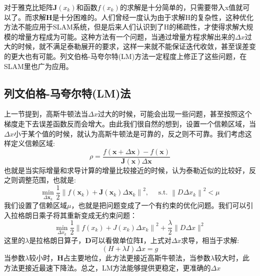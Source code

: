 对于雅克比矩阵$\boldsymbol{J}(x_k)$和函数$f(x_k)$的求解是十分简单的，只需要带入x值就可以了。而求解$\boldsymbol{H}$是十分困难的。人们曾经一度认为由于求解H的复杂性，这种优化方法不能应用于SLAM系统，但是后来人们认识到了H的稀疏性，才使得求解大规模的增量方程成为可能。这种方法有一个问题，当通过增量方程求解出来的$\Delta x$过大的时候，就不满足泰勒展开的要求，这样一来就不能保证迭代收敛，甚至误差变的更大也有可能。列文伯格-马夸尔特(LM)方法一定程度上修正了这些问题，在SLAM里也广为应用。
\subsection{列文伯格-马夸尔特(LM)法}
上一节提到，高斯牛顿法当$\Delta x$过大的时候，可能会出现一些问题，甚至按照这个梯度走下去误差函数反而会增大。由此我们很自然的想到，设置一个信赖区域，当$\Delta x$小于某个值的时候，就认为高斯牛顿法是可靠的，反之则不可靠。我们考虑这样定义信赖区域:
\begin{equation}
\rho=\frac{f(\boldsymbol{x}+\Delta \boldsymbol{x})-f(\boldsymbol{x})}{\boldsymbol{J}(\boldsymbol{x}) \Delta \boldsymbol{x}}
\end{equation}
也就是当实际增量和求导计算的增量比较接近的时候，认为泰勒近似的比较好，反之则调整范围，也就是:
\begin{equation}
\min _{\Delta \boldsymbol{x}_{k}} \frac{1}{2}\left\|f\left(\boldsymbol{x}_{k}\right)+\boldsymbol{J}\left(\boldsymbol{x}_{k}\right) \Delta \boldsymbol{x}_{k}\right\|^{2}, \quad \text { s.t. }\left\|D \Delta x_{k}\right\|^{2} < \mu
\end{equation}
我们设置了信赖区域$\mu$，也就是把问题变成了一个有约束的优化问题。我们可以引入拉格朗日乘子将其重新变成无约束问题：
\begin{equation}
\min _{\Delta x_{k}} \frac{1}{2}\left\|f\left(x_{k}\right)+J\left(x_{k}\right) \Delta x_{k}\right\|^{2}+\frac{\lambda}{2}\|D \Delta x\|^{2}
\end{equation}
这里的$\lambda$是拉格朗日算子，$\boldsymbol{D}$可以看做单位阵$\boldsymbol{I}$，上式对$\Delta x$求导，相当于求解:
\begin{equation}
(H+\lambda I) \Delta x=g
\end{equation}
当参数$\lambda$较小时，$\boldsymbol{H}$占主要地位，此方法更接近高斯牛顿法，当参数$\lambda$较大时，此方法更接近最速下降法。总之，LM方法能够提供更稳定，更准确的$\Delta x$
